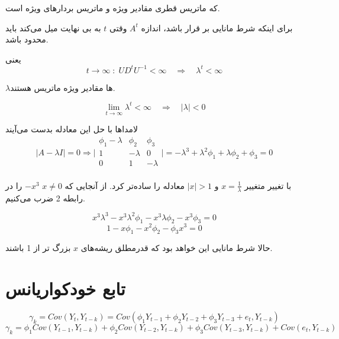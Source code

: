 \documentclass{article}
\begin{document}
که  ماتریس قطری مقادیر ویژه و  ماتریس بردارهای ویژه است.

برای اینکه شرط مانایی بر قرار باشد، اندازه $A^t$ وقتی $t$ به بی نهایت میل می‌کند باید محدود باشد.

یعنی
\[
    t \rightarrow \infty \; : \; UD^tU^{-1} < \infty \quad \Rightarrow \quad \lambda^t < \infty
\]

$\lambda$ها مقادیر ویژه ماتریس
 هستند.

\[ \lim_{t\rightarrow \infty} \lambda^t < \infty \quad \Rightarrow \quad | \lambda | < 0 \]

لامداها با حل این معادله بدست می‌آیند
\begin{equation}
    |A - \lambda I | = 0 
\Rightarrow \Bigg| \begin{matrix}
    \phi_1 -\lambda & \phi_2 & \phi_3 \\
    1      &    -\lambda   &   0    \\
    0      &    1   &   -\lambda    \\
\end{matrix} \Bigg| = -\lambda^3 +\lambda^2 \phi_1 + \lambda \phi_2 + \phi_3 = 0
\end{equation}

با تغییر متغییر $x = \frac{1}{\lambda} $ و $ |x| > 1 $ 
معادله را ساده‌تر کرد. از آنجایی که $x \neq 0 $
$-x^3$ را در رابطه 2 ضرب می‌کنیم.

\[
    x^3\lambda^3 -x^3\lambda^2 \phi_1 - x^3\lambda \phi_2 - x^3\phi_3 = 0 \]
\begin{equation}
    1 - x \phi_1 - x^2 \phi_2 - \phi_3 x^3 = 0
\end{equation}

حالا شرط مانایی این خواهد بود که قدرمطلق ریشه‌های $x$ 
بزرگ تر از 1 باشند.

\section{تابع خودکواریانس}

\[ \gamma_k = Cov(Y_t, Y_{t-k}) = Cov(\phi_1 Y_{t-1} + \phi_2 Y_{t-2} + \phi_3 Y_{t-3} + e_t , Y_{t-k})\]
\begin{equation}
    \gamma_k = \phi_1 Cov(Y_{t-1}, Y_{t-k}) + \phi_2 Cov(Y_{t-2}, Y_{t-k}) + \phi_3 Cov(Y_{t-3}, Y_{t-k}) + Cov(e_t , Y_{t-k})
\end{equation}
\end{document}
